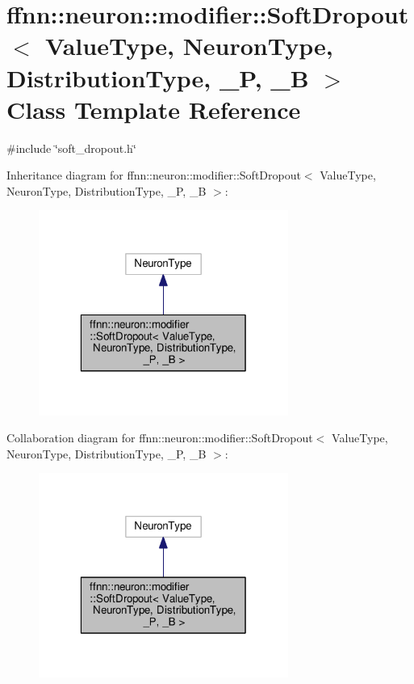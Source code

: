 \hypertarget{classffnn_1_1neuron_1_1modifier_1_1_soft_dropout}{\section{ffnn\-:\-:neuron\-:\-:modifier\-:\-:Soft\-Dropout$<$ Value\-Type, Neuron\-Type, Distribution\-Type, \-\_\-\-P, \-\_\-\-B $>$ Class Template Reference}
\label{classffnn_1_1neuron_1_1modifier_1_1_soft_dropout}
}


{\ttfamily \#include \char`\"{}soft\-\_\-dropout.\-h\char`\"{}}



Inheritance diagram for ffnn\-:\-:neuron\-:\-:modifier\-:\-:Soft\-Dropout$<$ Value\-Type, Neuron\-Type, Distribution\-Type, \-\_\-\-P, \-\_\-\-B $>$\-:
\nopagebreak
\begin{figure}[H]
\begin{center}
\leavevmode
\includegraphics[width=232pt]{classffnn_1_1neuron_1_1modifier_1_1_soft_dropout__inherit__graph}
\end{center}
\end{figure}


Collaboration diagram for ffnn\-:\-:neuron\-:\-:modifier\-:\-:Soft\-Dropout$<$ Value\-Type, Neuron\-Type, Distribution\-Type, \-\_\-\-P, \-\_\-\-B $>$\-:
\nopagebreak
\begin{figure}[H]
\begin{center}
\leavevmode
\includegraphics[width=232pt]{classffnn_1_1neuron_1_1modifier_1_1_soft_dropout__coll__graph}
\end{center}
\end{figure}

